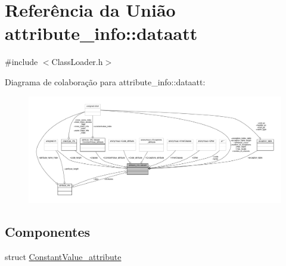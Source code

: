 \hypertarget{unionattribute__info_1_1dataatt}{}\section{Referência da União attribute\+\_\+info\+:\+:dataatt}
\label{unionattribute__info_1_1dataatt}


{\ttfamily \#include $<$Class\+Loader.\+h$>$}



Diagrama de colaboração para attribute\+\_\+info\+:\+:dataatt\+:
\nopagebreak
\begin{figure}[H]
\begin{center}
\leavevmode
\includegraphics[width=350pt]{unionattribute__info_1_1dataatt__coll__graph}
\end{center}
\end{figure}
\subsection*{Componentes}
\begin{DoxyCompactItemize}
\item 
struct \hyperlink{structattribute__info_1_1dataatt_1_1ConstantValue__attribute}{Constant\+Value\+\_\+attribute}
\end{DoxyCompactItemize}
